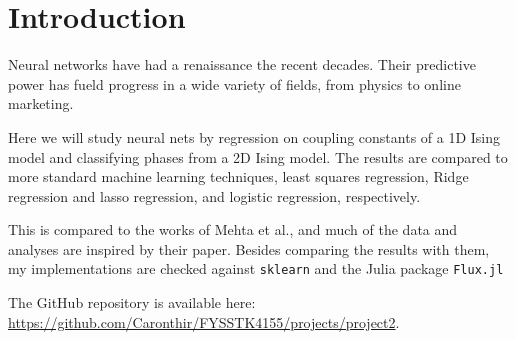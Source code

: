 \section{Introduction}

Neural networks have had a renaissance the recent decades. Their predictive
power has fueld progress in a wide variety of fields, from physics to online
marketing.

Here we will study neural nets by regression on coupling constants of  a 1D Ising
model and classifying phases from a 2D Ising model. The results are compared to
more standard machine learning techniques, least squares regression, Ridge
regression and lasso regression, and logistic regression, respectively.

This is compared to the works of Mehta et al.\cite{mehta}, and much of the data
and analyses are inspired by their paper. Besides comparing the results with
them, my implementations are checked against \texttt{sklearn} and the Julia
package \texttt{Flux.jl}

The GitHub repository is available here: \url{https://github.com/Caronthir/FYSSTK4155/projects/project2}.
